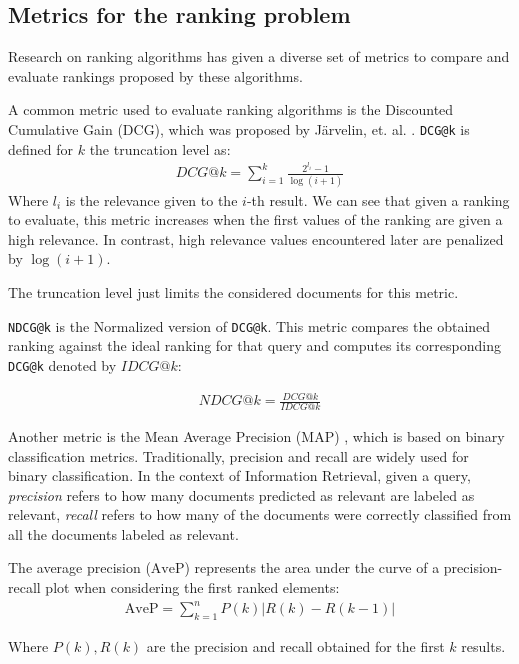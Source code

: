 \subsection{Metrics for the ranking problem}\label{s:bg-rnk-metrics}
Research on ranking algorithms has given a diverse set of metrics to compare and evaluate
rankings proposed by these algorithms. 

A common metric used to evaluate ranking algorithms is the Discounted Cumulative Gain (DCG), which was 
proposed by J\"{a}rvelin, et. al. \cite{10.1145/582415.582418}. 
\texttt{DCG@k} is defined for $k$ the truncation level as:
\begin{align*}
DCG@k = \sum_{i=1}^{k}\frac{2^{l_i}-1}{\log(i+1)}
\end{align*}
Where $l_i$ is the relevance given to the $i$-th result. We can see that given a ranking to evaluate, this metric increases
when the first values of the ranking are given a high relevance. In contrast, high relevance values encountered later are 
penalized by $\log(i+1)$.

The truncation level just limits the considered documents for this metric.

\texttt{NDCG@k} is the Normalized version of \texttt{DCG@k}. This metric compares the obtained ranking against
the ideal ranking for that query and computes its corresponding \texttt{DCG@k} denoted by $IDCG@k$:

\begin{align*}
NDCG@k = \frac{DCG@k}{IDCG@k}
\end{align*}

Another metric is the Mean Average Precision (MAP) \cite{zhumap}, which is based on binary classification metrics. Traditionally,
precision and recall are widely used for binary classification. In the context of
Information Retrieval, given a query, \emph{precision} refers to how many documents predicted as relevant
are labeled as relevant, \emph{recall} refers to how many of the documents were correctly
classified from all the documents labeled as relevant.

The average precision ($\text{AveP}$) represents the area under the curve of a precision-recall
plot when considering the first ranked elements:
\begin{align*}
\text{AveP} = \sum_{k=1}^{n} P(k)|R(k)-R(k-1)|
\end{align*}

Where $P(k), R(k)$ are the precision and recall obtained for the first $k$ results.

